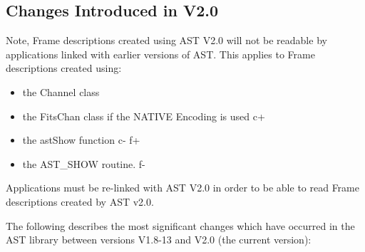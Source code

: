 \documentclass[twoside,11pt]{starlink}
\begin{document}
\subsection{Changes Introduced in V2.0}

Note, Frame descriptions created using AST V2.0 will not be readable by
applications linked with earlier versions of AST. This applies to Frame
descriptions created using:
\begin{itemize}
\item the Channel class
\item the FitsChan class if the NATIVE Encoding is used
c+
\item the astShow function
c-
f+
\item the AST\_SHOW routine.
f-
\end{itemize}

Applications must be re-linked with AST V2.0 in order to be able to read
Frame descriptions created by AST v2.0.

The following describes the most significant changes which have
occurred in the AST library between versions V1.8-13 and V2.0 (the
current version):
\end{document}
